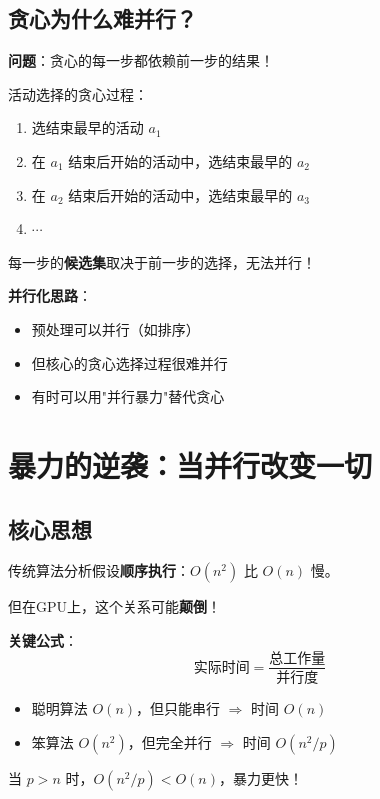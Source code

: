 \documentclass[12pt, a4paper]{ctexart}
\begin{document}
\subsection{贪心为什么难并行？}

\begin{gpubox}[贪心的顺序依赖]

\textbf{问题}：贪心的每一步都依赖前一步的结果！

活动选择的贪心过程：
\begin{enumerate}
    \item 选结束最早的活动 $a_1$
    \item 在 $a_1$ 结束后开始的活动中，选结束最早的 $a_2$
    \item 在 $a_2$ 结束后开始的活动中，选结束最早的 $a_3$
    \item $\cdots$
\end{enumerate}

每一步的\textbf{候选集}取决于前一步的选择，无法并行！

\textbf{并行化思路}：
\begin{itemize}
    \item 预处理可以并行（如排序）
    \item 但核心的贪心选择过程很难并行
    \item 有时可以用"并行暴力"替代贪心
\end{itemize}

\end{gpubox}

\section{暴力的逆袭：当并行改变一切}

\subsection{核心思想}

\begin{insight}[复杂度的重新审视]

传统算法分析假设\textbf{顺序执行}：$O(n^2)$ 比 $O(n)$ 慢。

但在GPU上，这个关系可能\textbf{颠倒}！

\textbf{关键公式}：
\[
\text{实际时间} = \frac{\text{总工作量}}{\text{并行度}}
\]

\begin{itemize}
    \item 聪明算法 $O(n)$，但只能串行 $\Rightarrow$ 时间 $O(n)$
    \item 笨算法 $O(n^2)$，但完全并行 $\Rightarrow$ 时间 $O(n^2 / p)$
\end{itemize}

当 $p > n$ 时，$O(n^2/p) < O(n)$，暴力更快！

\end{insight}
\end{document}

